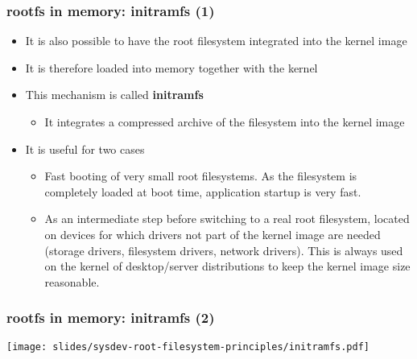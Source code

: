 \begin{frame}
  \frametitle{rootfs in memory: initramfs (1)}
  \begin{itemize}
  \item It is also possible to have the root filesystem integrated
    into the kernel image
  \item It is therefore loaded into memory together with the kernel
  \item This mechanism is called {\bf initramfs}
    \begin{itemize}
    \item It integrates a compressed archive of the filesystem into
      the kernel image
    \end{itemize}
  \item It is useful for two cases
    \begin{itemize}
    \item Fast booting of very small root filesystems. As the
      filesystem is completely loaded at boot time, application
      startup is very fast.
    \item As an intermediate step before switching to a real root
      filesystem, located on devices for which drivers not part of the
      kernel image are needed (storage drivers, filesystem drivers,
      network drivers). This is always used on the kernel of
      desktop/server distributions to keep the kernel image size
      reasonable.
    \end{itemize}
  \end{itemize}
\end{frame}

\begin{frame}
  \frametitle{rootfs in memory: initramfs (2)}
  \begin{center}
    \texttt{[image: slides/sysdev-root-filesystem-principles/initramfs.pdf]}
  \end{center}
\end{frame}

